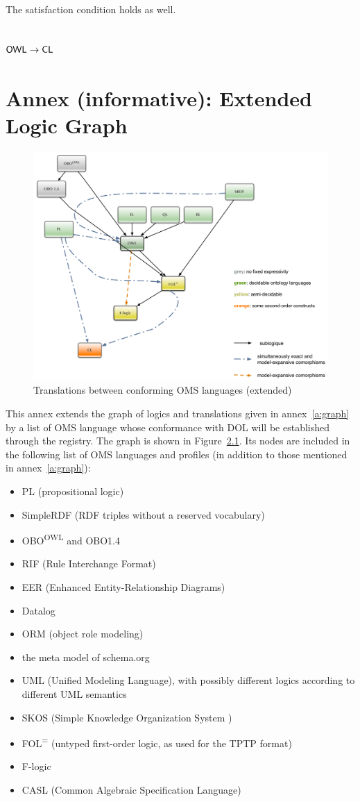 \documentclass[10pt,%
\ifpretendfinal
final%
\else
draft%
\fi,
]{scrreprt}
\newcommand*{\CL}{\ensuremath{\mathsf{CL}}\xspace}
\newcommand{\annexrefname}{annex}
\newcommand{\figurerefname}{Figure}
\newcommand{\aref}[1]{\annexrefname~\ref{#1}}
\newcommand{\fref}[1]{\figurerefname~\ref{#1}}
\newcommand{\sclause}[1]{\section{#1}}
\newcommand{\infannex}[1]{ \chapter{Annex (informative): #1} }
\begin{document}
	The satisfaction condition holds as well.

\sclause{$\OWL \rightarrow \CL$}


\infannex{Extended Logic Graph}\label{a:ext-graph}

\begin{figure}
  \centering
  \includegraphics[width=\textwidth]{illustrations/pre-reduced-ontograph}
  \caption{Translations between conforming OMS languages (extended)}
  \label{fig:pre-ontograph}
\end{figure}
This annex extends the graph of logics and translations given in
\aref{a:graph} by a list of OMS language whose conformance with
DOL will be established through the registry.  The graph is shown in
\fref{fig:pre-ontograph}.  Its nodes are included in the following
list of OMS languages and profiles (in addition to those
mentioned in \aref{a:graph}):
\begin{itemize}
\item PL (propositional logic)
\item SimpleRDF (RDF triples without a reserved vocabulary)
\item OBO\textsuperscript{OWL} and OBO1.4
\item RIF (Rule Interchange Format)
\item EER (Enhanced Entity-Relationship Diagrams) %
\item Datalog
\item ORM (object role modeling)
\item the meta model of schema.org
\item UML (Unified Modeling Language), with possibly different logics according to different
UML semantics
\item SKOS (Simple Knowledge Organization System )
\item FOL\textsuperscript{=} (untyped first-order logic, as used for the
TPTP format)
\item F-logic
\item CASL (Common Algebraic Specification Language)
\end{itemize}
\end{document}
